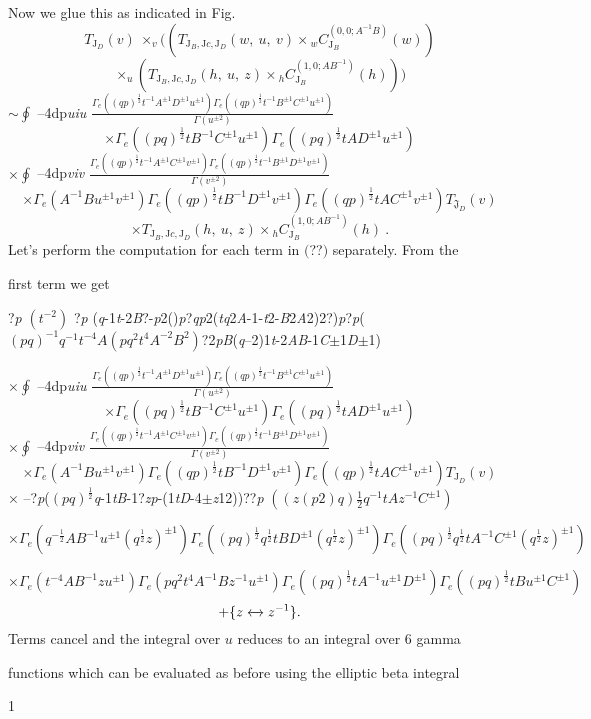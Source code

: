 \documentclass[a4paper,12pt]{article}
\begin{document}
Now we glue this as indicated in Fig.
$$
T_{\mathrm{J}_{D}}(v)\ \times_{v}((T_{\mathrm{J}_{B},\mathrm{J}c,\mathrm{J}_{D}}(w,\ u,\ v)\times {}_{w}C_{\mathrm{J}_{B}}^{(0,0;A^{-1}B)}(w))
$$
$$
\times_{u}(T_{\mathrm{J}_{B},\mathrm{J}c,\mathrm{J}_{D}}(h,\ u,\ z)\times {}_{h}C_{\mathrm{J}_{B}}^{(1,0;AB^{-1})}(h)))
$$
$\displaystyle \sim\oint$ --4dp{\it uiu} $\displaystyle \frac{\Gamma_{e}((qp)^{\frac{1}{2}}t^{-1}A^{\pm 1}D^{\pm 1}u^{\pm 1})\Gamma_{e}((qp)^{\frac{1}{2}}t^{-1}B^{\pm 1}C^{\pm 1}u^{\pm 1})}{\Gamma(u^{\pm 2})}$
$$
\times\Gamma_{e}((pq)^{\frac{1}{2}}tB^{-1}C^{\pm 1}u^{\pm 1})\Gamma_{e}((pq)^{\frac{1}{2}}tAD^{\pm 1}u^{\pm 1})
$$
$\displaystyle \times\oint$ --4dp{\it viv} $\displaystyle \frac{\Gamma_{e}((qp)^{\frac{1}{2}}t^{-1}A^{\pm 1}C^{\pm 1}v^{\pm 1})\Gamma_{e}((qp)^{\frac{1}{2}}t^{-1}B^{\pm 1}D^{\pm 1}v^{\pm 1})}{\Gamma(v^{\pm 2})}$
$$
\times\Gamma_{e}(A^{-1}Bu^{\pm 1}v^{\pm 1})\Gamma_{e}((qp)^{\frac{1}{2}}tB^{-1}D^{\pm 1}v^{\pm 1})\Gamma_{e}((qp)^{\frac{1}{2}}tAC^{\pm 1}v^{\pm 1})T_{\mathfrak{J}_{D}}(v)
$$
$$
\times T_{\mathrm{J}_{B},\mathrm{J}c,\mathrm{J}_{D}}(h,\ u,\ z)\times {}_{h}C_{\mathrm{J}_{B}}^{(1,0;AB^{-1})}(h)\ .
$$
Let’s perform the computation for each term in $($??$)$ separately. From the

first term we get

?{\it p} $(t^{-2})$ ?{\it p} ({\it q}-1{\it t}-2{\it B}?-{\it p}2(){\it p}?{\it qp}2({\it tq}2{\it A}-1-{\it t}2-{\it B}2{\it A}2)2?){\it p}?{\it p}( $(pq)^{-1}q^{-1}t^{-4}A(pq^{2}t^{4}A^{-2}B^{2})$?2{\it pB}({\it q}--2)1{\it t}-2{\it AB}-1{\it C}$\pm$1{\it D}$\pm$1)

$\displaystyle \times\oint$ --4dp{\it uiu} $\displaystyle \frac{\Gamma_{e}((qp)^{\frac{1}{2}}t^{-1}A^{\pm 1}D^{\pm 1}u^{\pm 1})\Gamma_{e}((qp)^{\frac{1}{2}}t^{-1}B^{\pm 1}C^{\pm 1}u^{\pm 1})}{\Gamma(u^{\pm 2})}$
$$
\times\Gamma_{e}((pq)^{\frac{1}{2}}tB^{-1}C^{\pm 1}u^{\pm 1})\Gamma_{e}((pq)^{\frac{1}{2}}tAD^{\pm 1}u^{\pm 1})
$$
$\displaystyle \times\oint$ --4dp{\it viv} $\displaystyle \frac{\Gamma_{e}((qp)^{\frac{1}{2}}t^{-1}A^{\pm 1}C^{\pm 1}v^{\pm 1})\Gamma_{e}((qp)^{\frac{1}{2}}t^{-1}B^{\pm 1}D^{\pm 1}v^{\pm 1})}{\Gamma(v^{\pm 2})}$
$$
\times\Gamma_{e}(A^{-1}Bu^{\pm 1}v^{\pm 1})\Gamma_{e}((qp)^{\frac{1}{2}}tB^{-1}D^{\pm 1}v^{\pm 1})\Gamma_{e}((qp)^{\frac{1}{2}}tAC^{\pm 1}v^{\pm 1})T_{\mathrm{J}_{D}}(v)
$$
$\times$ --?{\it p}($(pq)^{\frac{1}{2}}${\it q}-1{\it tB}-1?{\it zp}-(1{\it tD}-4$\pm${\it z}12))??{\it p} $((z(p2)q)\displaystyle \frac{1}{2}q^{-1}tAz^{-1}C^{\pm 1})$

$\times\Gamma_{e}(q^{-\frac{1}{2}}AB^{-1}u^{\pm 1}(q^{\frac{1}{2}}z)^{\pm 1})\Gamma_{e}((pq)^{\frac{1}{2}}q^{\frac{1}{2}}tBD^{\pm 1}(q^{\frac{1}{2}}z)^{\pm 1})\Gamma_{e}((pq)^{\frac{1}{2}}q^{\frac{1}{2}}tA^{-1}C^{\pm 1}(q^{\frac{1}{2}}z)^{\pm 1})$

$\times\Gamma_{e}(t^{-4}AB^{-1}zu^{\pm 1})\Gamma_{e}(pq^{2}t^{4}A^{-1}Bz^{-1}u^{\pm 1})\Gamma_{e}((pq)^{\frac{1}{2}}tA^{-1}u^{\pm 1}D^{\pm 1})\Gamma_{e}((pq)^{\frac{1}{2}}tBu^{\pm 1}C^{\pm 1})$
$$
+\{z\xleftrightarrow{}z^{-1}\}.
$$
Terms cancel and the integral over $u$ reduces to an integral over 6 gamma

functions which can be evaluated as before using the elliptic beta integral

1
\end{document}
